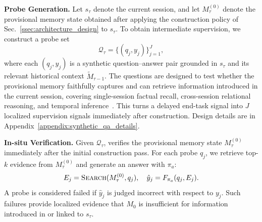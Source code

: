 \noindent\textbf{Probe Generation.}
Let $s_\tau$ denote the current session, and let $M_{\tau}^{(0)}$ denote the provisional memory state obtained after applying the construction policy of Sec.~\ref{ssec:architecture_design} to $s_\tau$.
To obtain intermediate supervision, we construct a probe set
\begin{equation}
\mathcal{Q}_\tau = \{(q_j, y_j)\}_{j=1}^{J},
\end{equation}
where each $(q_j, y_j)$ is a synthetic question--answer pair grounded in $s_\tau$ and its relevant historical context $\tilde{M}_{\tau-1}$.
The questions are designed to test whether the provisional memory faithfully captures and can retrieve information introduced in the current session, covering single-session factual recall, cross-session relational reasoning, and temporal inference~\cite{shen2026membuilder}.
This turns a delayed end-task signal into $J$ localized supervision signals immediately after construction.
Design details are in Appendix~\ref{appendix:synthetic_qa_details}.


\noindent\textbf{In-situ Verification.}
Given $\mathcal{Q}_\tau$, \method verifies the provisional memory state $M_{\tau}^{(0)}$ immediately after the initial construction pass.
For each probe $q_j$, we retrieve top-$k$ evidence from $M_{\tau}^{(0)}$ and generate an answer with $\pi_a$:
\begin{equation}
E_j = \textsc{Search}(M_{\tau}^{(0)}, q_j), \quad
\hat{y}_j = F_{\pi_a}(q_j, E_j).
\end{equation}
A probe is considered failed if $\hat{y}_j$ is judged incorrect with respect to $y_j$.
Such failures provide localized evidence that $M_{\mathrm{0}}$ is insufficient for information introduced in or linked to $s_\tau$.

